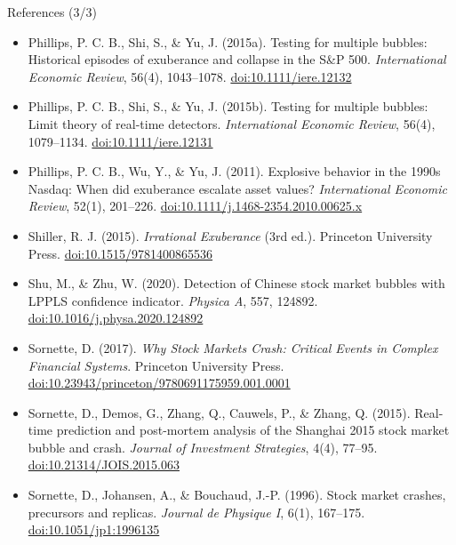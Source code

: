 \begin{frame}{References (3/3)}
\itemsize{\scriptsize}
\begin{itemize}
    \item Phillips, P. C. B., Shi, S., \& Yu, J. (2015a). Testing for multiple bubbles: Historical episodes of exuberance and collapse in the S\&P 500. \textit{International Economic Review}, 56(4), 1043--1078. \href{https://doi.org/10.1111/iere.12132}{doi:10.1111/iere.12132}
    \item Phillips, P. C. B., Shi, S., \& Yu, J. (2015b). Testing for multiple bubbles: Limit theory of real-time detectors. \textit{International Economic Review}, 56(4), 1079--1134. \href{https://doi.org/10.1111/iere.12131}{doi:10.1111/iere.12131}
    \item Phillips, P. C. B., Wu, Y., \& Yu, J. (2011). Explosive behavior in the 1990s Nasdaq: When did exuberance escalate asset values? \textit{International Economic Review}, 52(1), 201--226. \href{https://doi.org/10.1111/j.1468-2354.2010.00625.x}{doi:10.1111/j.1468-2354.2010.00625.x}
    \item Shiller, R. J. (2015). \textit{Irrational Exuberance} (3rd ed.). Princeton University Press. \href{https://doi.org/10.1515/9781400865536}{doi:10.1515/9781400865536}
    \item Shu, M., \& Zhu, W. (2020). Detection of Chinese stock market bubbles with LPPLS confidence indicator. \textit{Physica A}, 557, 124892. \href{https://doi.org/10.1016/j.physa.2020.124892}{doi:10.1016/j.physa.2020.124892}
    \item Sornette, D. (2017). \textit{Why Stock Markets Crash: Critical Events in Complex Financial Systems}. Princeton University Press. \href{https://doi.org/10.23943/princeton/9780691175959.001.0001}{doi:10.23943/princeton/9780691175959.001.0001}
    \item Sornette, D., Demos, G., Zhang, Q., Cauwels, P., \& Zhang, Q. (2015). Real-time prediction and post-mortem analysis of the Shanghai 2015 stock market bubble and crash. \textit{Journal of Investment Strategies}, 4(4), 77--95. \href{https://doi.org/10.21314/JOIS.2015.063}{doi:10.21314/JOIS.2015.063}
    \item Sornette, D., Johansen, A., \& Bouchaud, J.-P. (1996). Stock market crashes, precursors and replicas. \textit{Journal de Physique I}, 6(1), 167--175. \href{https://doi.org/10.1051/jp1:1996135}{doi:10.1051/jp1:1996135}
\end{itemize}
\end{frame}


